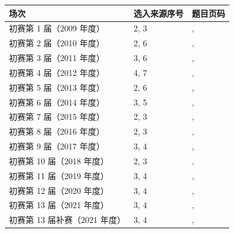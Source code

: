 \documentclass[UTF8,12pt,a4paper,fontset=fandol]{ctexart}
\begin{document}
\begin{longtable}{p{}p{}p{}}

\toprule 场次 & 选入来源序号 & 题目页码\\\midrule\endhead

初赛第 1 届（2009 年度） & 2, 3 & \pageref{ex:pre01-math:2}, \pageref{ex:pre01-math:3}\\

初赛第 2 届（2010 年度） & 2, 6 & \pageref{ex:pre02-math:2}, \pageref{ex:pre02-math:6}\\

初赛第 3 届（2011 年度） & 3, 6 & \pageref{ex:pre03-math:3}, \pageref{ex:pre03-math:6}\\

初赛第 4 届（2012 年度） & 4, 7 & \pageref{ex:pre04-math:4}, \pageref{ex:pre04-math:7}\\

初赛第 5 届（2013 年度） & 2, 6 & \pageref{ex:pre05-math:2}, \pageref{ex:pre05-math:6}\\

初赛第 6 届（2014 年度） & 3, 5 & \pageref{ex:pre06-math:3}, \pageref{ex:pre06-math:5}\\

初赛第 7 届（2015 年度） & 2, 3 & \pageref{ex:pre07-math:2}, \pageref{ex:pre07-math:3}\\

初赛第 8 届（2016 年度） & 2, 3 & \pageref{ex:pre08-math:2}, \pageref{ex:pre08-math:3}\\

初赛第 9 届（2017 年度） & 3, 4 & \pageref{ex:pre09-math:3}, \pageref{ex:pre09-math:4}\\

初赛第 10 届（2018 年度） & 2, 3 & \pageref{ex:pre10-math:2}, \pageref{ex:pre10-math:3}\\

初赛第 11 届（2019 年度） & 3, 4 & \pageref{ex:ch10-11th-A:3}, \pageref{ex:ch10-11th-A:4}\\

初赛第 12 届（2020 年度） & 3, 4 & \pageref{ex:ch09-12th-A:3}, \pageref{ex:ch09-12th-A:4}\\

初赛第 13 届（2021 年度） & 3, 4 & \pageref{ex:ch07-13th-A:3}, \pageref{ex:ch07-13th-A:4}\\

初赛第 13 届补赛（2021 年度） & 3, 4 & \pageref{ex:ch08-13th-A-makeup:3}, \pageref{ex:ch08-13th-A-makeup:4}\\


\end{longtable}
\end{document}
